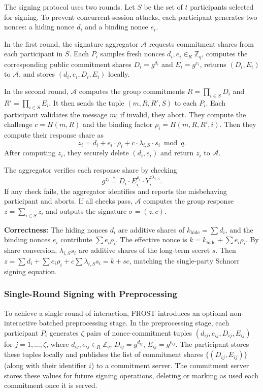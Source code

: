 The signing protocol uses two rounds. Let \(S\) be the set of \(t\) participants selected for signing. To prevent concurrent-session attacks, each participant generates two nonces: a hiding nonce \(d_i\) and a binding nonce \(e_i\).

In the first round, the signature aggregator \(\mathcal{A}\) requests commitment shares from each participant in \(S\). Each \(P_i\) samples fresh nonces \(d_i,e_i\in_R\mathbb{Z}_q\), computes the corresponding public commitment shares \(D_i=g^{d_i}\) and \(E_i=g^{e_i}\), returns \((D_i,E_i)\) to \(\mathcal{A}\), and stores \((d_i,e_i,D_i,E_i)\) locally.

In the second round, \(\mathcal{A}\) computes the group commitments \(R=\prod_{i\in S}D_i\) and \(R'=\prod_{i\in S}E_i\). It then sends the tuple \((m,R,R',S)\) to each \(P_i\). Each participant validates the message \(m\); if invalid, they abort. They compute the challenge \(c=H(m,R)\) and the binding factor \(\rho_i = H(m, R, R', i)\). Then they compute their response share as
\[
z_i = d_i + e_i \cdot \rho_i + c \cdot \lambda_{i,S} \cdot s_i \bmod q.
\]
After computing \(z_i\), they securely delete \((d_i,e_i)\) and return \(z_i\) to \(\mathcal{A}\).

The aggregator verifies each response share by checking
\[
g^{z_i} \stackrel{?}{=} D_i \cdot E_i^{\rho_i} \cdot Y_i^{c\lambda_{i,S}}.
\]
If any check fails, the aggregator identifies and reports the misbehaving participant and aborts. If all checks pass, \(\mathcal{A}\) computes the group response \(z = \sum_{i\in S} z_i\) and outputs the signature \(\sigma = (z, c)\).

\textbf{Correctness:} The hiding nonces \(d_i\) are additive shares of \(k_{\text{hide}}=\sum d_i\), and the binding nonces \(e_i\) contribute \(\sum e_i\rho_i\). The effective nonce is \(k = k_{\text{hide}} + \sum e_i\rho_i\). By share conversion, \(\lambda_{i,S}s_i\) are additive shares of the long-term secret \(s\). Then \(z = \sum d_i + \sum e_i\rho_i + c \sum \lambda_{i,S}s_i = k + s c\), matching the single-party Schnorr signing equation.

\subsubsection{Single-Round Signing with Preprocessing}

To achieve a single round of interaction, FROST introduces an optional non-interactive batched preprocessing stage. In the preprocessing stage, each participant \(P_i\) generates \(\zeta\) pairs of nonce-commitment tuples \((d_{ij}, e_{ij}, D_{ij}, E_{ij})\) for \(j=1,\ldots,\zeta\), where \(d_{ij},e_{ij}\in_R\mathbb{Z}_q\), \(D_{ij}=g^{d_{ij}}\), \(E_{ij}=g^{e_{ij}}\). The participant stores these tuples locally and publishes the list of commitment shares \(\{(D_{ij},E_{ij})\}\) (along with their identifier \(i\)) to a commitment server. The commitment server stores these values for future signing operations, deleting or marking as used each commitment once it is served.

